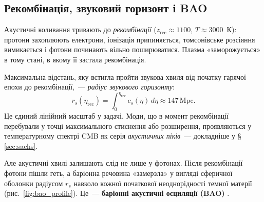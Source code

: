 \documentclass[12pt, a4paper]{article}
\begin{document}
\subsection{Рекомбінація, звуковий горизонт і BAO}

Акустичні коливання тривають до \emph{рекомбінації}
($z_\mathrm{rec} \approx 1100$, $T \approx 3000$~К):
протони захоплюють електрони, іонізація припиняється,
томсонівське розсіяння вимикається і фотони починають
вільно поширюватися. Плазма «заморожується» в тому стані,
в якому її застала рекомбінація.

Максимальна відстань, яку встигла пройти звукова хвиля
від початку гарячої епохи до рекомбінації,~---
\emph{радіус звукового горизонту}:
\begin{equation}\label{eq:sound_horizon}
  r_s(\eta_\mathrm{rec})
    = \int_0^{\eta_\mathrm{rec}} c_s(\eta)\,d\eta
    \approx 147\,\mathrm{Mpc}.
\end{equation}
Це єдиний лінійний масштаб у задачі. Моди, що в момент
рекомбінації перебували у точці максимального стиснення
або розширення, проявляються у температурному спектрі
CMB як серія \emph{акустичних піків}~--- докладніше
у §\,\ref{sec:sachs}.

Але акустичні хвилі залишають слід не лише у фотонах.
Після рекомбінації фотони пішли геть, а баріонна речовина
«замерзла» у вигляді сферичної оболонки радіусом $r_s$
навколо кожної початкової неоднорідності темної матерії
(рис.~\ref{fig:bao_profile}). Це~--- \textbf{баріонні
акустичні осциляції (BAO)} \cite{eisenstein_2005}.
\end{document}
